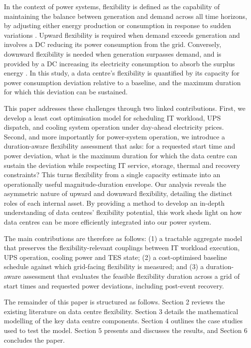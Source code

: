 \documentclass[lettersize,journal]{IEEEtran}
\newcommand{\rev}[1]{\textcolor{blue!70!black}{#1}}
\begin{document}
In the context of power systems, flexibility is defined as the capability of maintaining the balance between generation and demand across all time horizons, by adjusting either energy production or consumption in response to sudden variations \cite{Centrica2020LEM, EEAACER2023Flex, neso2025future, Nosair2015TSTE}. Upward flexibility is required when demand exceeds generation and involves a DC reducing its power consumption from the grid. Conversely, downward flexibility is needed when generation surpasses demand, and is provided by a DC increasing its electricity consumption to absorb the surplus energy \cite{Centrica2020LEM, NG2017SNAPS}. In this study, a data centre's flexibility is quantified by its capacity for power consumption deviation relative to a baseline, and the maximum duration for which this deviation can be sustained.

\rev{This paper addresses these challenges through two linked contributions. First, we develop a least cost optimisation model for scheduling IT workload, UPS dispatch, and cooling system operation under day-ahead electricity prices. Second, and more importantly for power-system operation, we introduce a duration-aware flexibility assessment that asks: for a requested start time and power deviation, what is the maximum duration for which the data centre can sustain the deviation while respecting IT service, storage, thermal and recovery constraints? This turns flexibility from a single capacity estimate into an operationally useful magnitude-duration envelope.}
Our analysis reveals the asymmetric nature of upward and downward flexibility, detailing the distinct roles of each internal asset. By providing a method to develop an in-depth understanding of data centres' flexibility potential, this work sheds light on how data centres can be more efficiently integrated into our power system.

\rev{The main contributions are therefore as follows: (1) a tractable aggregate model that preserves the flexibility-relevant couplings between IT workload execution, UPS operation, cooling power and TES state; (2) a cost-optimised baseline schedule against which grid-facing flexibility is measured; and (3) a duration-aware assessment that evaluates the feasible flexibility duration across a grid of start times and requested power deviations, including post-event recovery.}

The remainder of this paper is structured as follows. Section 2 reviews the existing literature on data centre flexibility. Section 3 details the mathematical modelling of the key data centre components. Section 4 outlines the case studies used to test the model. Section 5 presents and discusses the results, and Section 6 concludes the paper. 
\end{document}
